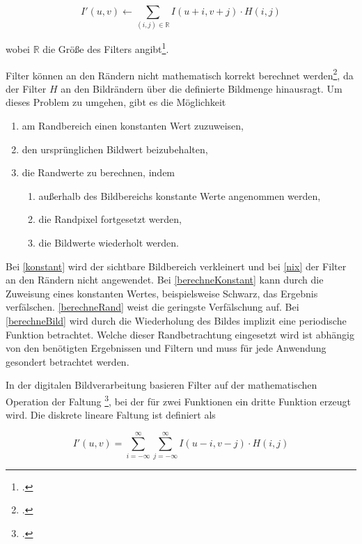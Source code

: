 \begin{equation}
	I'\left(u,v\right) \gets
	\sum_{\left(i,j\right)\in\mathbb{R}} I\left(u + i, v + j\right) \cdot H\left(i,j\right)
\end{equation}

wobei $\mathbb{R}$ die Größe des Filters angibt\footcite[Vgl.][S.~92--93]{burger05}.

Filter können an den Rändern nicht mathematisch korrekt berechnet werden\footcite[Vgl.][S.~113]{burger05}, da der Filter $H$ an den Bildrändern über die definierte Bildmenge hinausragt. Um dieses Problem zu umgehen, gibt es die Möglichkeit

\begin{enumerate}
	\item am Randbereich einen konstanten Wert zuzuweisen,\label{konstant}
	\item den ursprünglichen Bildwert beizubehalten,\label{nix}
	\item die Randwerte zu berechnen, indem
	\begin{enumerate}
		\item außerhalb des Bildbereichs konstante Werte angenommen werden,\label{berechneKonstant}
		\item die Randpixel fortgesetzt werden,\label{berechneRand}
		\item die Bildwerte wiederholt werden.\label{berechneBild}
	\end{enumerate}
\end{enumerate}

Bei \autoref{konstant} wird der sichtbare Bildbereich verkleinert und bei \autoref{nix} der Filter an den Rändern nicht
 angewendet. Bei \autoref{berechneKonstant} kann durch die Zuweisung eines konstanten Wertes, beispielsweise Schwarz,
 das Ergebnis verfälschen. \autoref{berechneRand} weist die geringste Verfälschung auf. Bei \autoref{berechneBild} wird
 durch die Wiederholung des Bildes implizit eine periodische Funktion betrachtet. Welche dieser Randbetrachtung
 eingesetzt wird ist abhängig von den benötigten Ergebnissen und Filtern und muss für jede Anwendung gesondert
 betrachtet werden.

In der digitalen Bildverarbeitung basieren Filter auf der mathematischen Operation der Faltung
\footcite[Vgl.][S.~101--104]{burger05}, bei der für zwei Funktionen ein dritte Funktion erzeugt wird. Die diskrete
 lineare Faltung ist definiert als

\begin{equation}
	I'\left(u,v\right) =
	\sum \limits_{i = -\infty}^{\infty}
	\sum \limits_{j = -\infty}^{\infty}
	I\left(u - i, v - j\right) \cdot H\left(i,j\right)
\end{equation}

